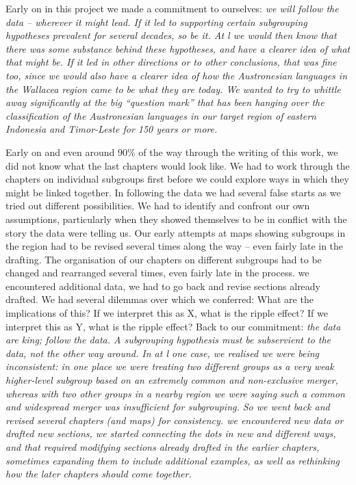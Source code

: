 Early on in this project we made a commitment to ourselves: \it{we will follow the data -- wherever it might lead}.
If it led to supporting certain subgrouping hypotheses prevalent for several decades, so be it.
At l we would then know that there was some substance behind these hypotheses,
and have a clearer idea of what that might be.
If it led in other directions or to other conclusions, that was fine too,
since we would also have a clearer idea of how the Austronesian languages in the Wallacea region came to be what they are today.
We wanted to try to whittle away significantly at the big ``question mark''
that has been hanging over the classification of the Austronesian
languages in our target region of eastern Indonesia and Timor-Leste for 150 years or more.

Early on and even around 90{\%} of the way through the writing of this work,
we did not know what the last chapters would look like.
We had to work through the chapters on individual subgroups first before we could explore ways in which they might be linked together.
In following the data we had several false starts as we tried out different possibilities.
We had to identify and confront our own assumptions,
particularly when they showed themselves to be in conflict with the story the data were telling us.
Our early attempts at maps showing subgroups in the region had to be revised several times along the way -- even fairly late in the drafting.
The organisation of our chapters on different subgroups had to be changed and rearranged several times, even fairly late in the process.
 we encountered additional data, we had to go back and revise sections already drafted.
We had several dilemmas over which we conferred: What are the implications of this? If we interpret this as X,
what is the ripple effect? If we interpret this as Y,
what is the ripple effect? Back to our commitment: \it{the data are king; follow the data.
A subgrouping hypothesis must be subservient to the data,
not the other way around.} In at l one case,
we realised we were being inconsistent:
in one place we were treating two different groups as a very weak higher-level
subgroup based on an extremely common and non-exclusive merger,
whereas with two other groups in a nearby region we were saying
such a common and widespread merger was insufficient for subgrouping.
So we went back and revised several chapters (and maps) for consistency.
 we encountered new data or drafted new sections,
we started connecting the dots in new and different ways,
and that required modifying sections already drafted in the earlier chapters,
sometimes expanding them to include additional examples,
as well as rethinking how the later chapters should come together.

